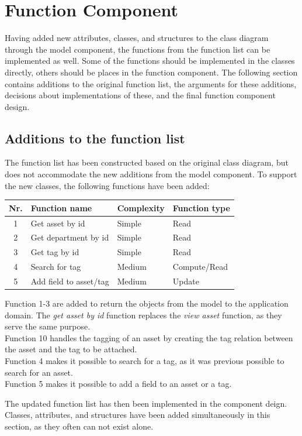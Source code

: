 \section{Function Component} \label{sc:function_component}
Having added new attributes, classes, and structures to the class diagram through the model component, the functions from the function list can be implemented as well. Some of the functions should be implemented in the classes directly, others should be places in the function component. The following section contains additions to the original function list, the arguments for these additions, decisions about implementations of these, and the final function component design.

\subsection{Additions to the function list}
The function list has been constructed based on the original class diagram, but does not accommodate the new additions from the model component. To support the new classes, the following functions have been added:

\begin{table}[H]
\centering
    \begin{tabular}{c|l|l|l}
        \textbf{Nr.} & \textbf{Function name} & \textbf{Complexity} & \textbf{Function type}\\
        \hline
        1 & Get asset by id & Simple & Read\\
        \hline
        2 & Get department by id & Simple & Read\\
        \hline
        3 & Get tag by id & Simple & Read\\
        \hline
        4 & Search for tag & Medium & Compute/Read\\
        \hline
        5 & Add field to asset/tag & Medium & Update\\
        \hline
    \end{tabular}
\end{table}

Function 1-3 are added to return the objects from the model to the application domain. The \textit{get asset by id} function replaces the \textit{view asset} function, as they serve the same purpose.\\
Function 10 handles the tagging of an asset by creating the tag relation between the asset and the tag to be attached.\\
Function 4 makes it possible to search for a tag, as it was previous possible to search for an asset.\\
Function 5 makes it possible to add a field to an asset or a tag.
\par
The updated function list has then been implemented in the component deign. Classes, attributes, and structures have been added simultaneously in this section, as they often can not exist alone.

